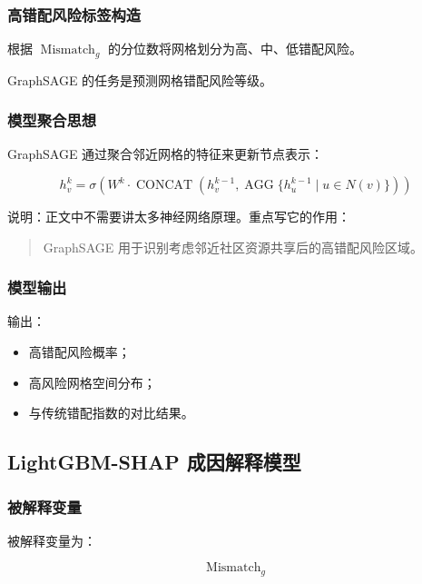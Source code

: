 \documentclass[UTF8,zihao=-4,a4paper,fontset=none]{ctexart}
\begin{document}
\subsubsection{高错配风险标签构造}

根据 $\operatorname{Mismatch}_g$ 的分位数将网格划分为高、中、低错配风险。

GraphSAGE 的任务是预测网格错配风险等级。

\subsubsection{模型聚合思想}

GraphSAGE 通过聚合邻近网格的特征来更新节点表示：

\begin{equation}
h_v^k = \sigma \left(W^k \cdot \operatorname{CONCAT}\left(h_v^{k-1}, \operatorname{AGG}\{h_u^{k-1}\mid u \in N(v)\}\right)\right)
\end{equation}

说明：正文中不需要讲太多神经网络原理。重点写它的作用：

\begin{quote}
GraphSAGE 用于识别考虑邻近社区资源共享后的高错配风险区域。
\end{quote}

\subsubsection{模型输出}

输出：

\begin{itemize}
\item 高错配风险概率；
\item 高风险网格空间分布；
\item 与传统错配指数的对比结果。
\end{itemize}

\subsection{LightGBM-SHAP 成因解释模型}

\subsubsection{被解释变量}

被解释变量为：

\begin{equation}
\operatorname{Mismatch}_g
\end{equation}
\end{document}
